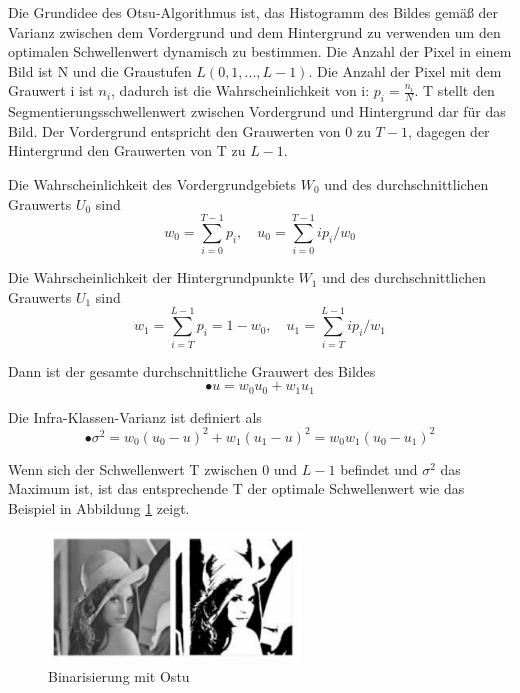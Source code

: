 Die Grundidee des Otsu-Algorithmus ist, das Histogramm des Bildes gemäß der Varianz zwischen dem Vordergrund und dem Hintergrund zu verwenden um den optimalen Schwellenwert dynamisch zu bestimmen. Die Anzahl der Pixel in einem Bild ist N und die Graustufen $ L(0,1,...,L-1) $. Die Anzahl der Pixel mit dem Grauwert i ist $ n_{i} $, dadurch ist die Wahrscheinlichkeit von i: $ p_{i} = \frac{n_{i}}{N} $. T stellt den Segmentierungsschwellenwert zwischen Vordergrund und Hintergrund dar für das Bild. Der Vordergrund entspricht den Grauwerten von 0 zu $ T-1 $, dagegen der Hintergrund den Grauwerten von T zu $ L -1 $.

Die Wahrscheinlichkeit des Vordergrundgebiets $ W_{0} $ und des durchschnittlichen Grauwerts $ U_{0} $ sind
\begin{equation}
  w_{0} = \sum_{i=0}^{T-1} p_{i},\quad u_{0} = \sum_{i=0}^{T-1} ip_{i}/w_{0}
\end{equation}

Die Wahrscheinlichkeit der Hintergrundpunkte $ W_{1} $ und des durchschnittlichen Grauwerts $ U_{1} $ sind
\begin{equation}
  w_{1} = \sum_{i=T}^{L-1} p_{i} = 1-w_{0},\quad u_{1} = \sum_{i=T}^{L-1} ip_{i}/w_{1}
\end{equation}

Dann ist der gesamte durchschnittliche Grauwert des Bildes
\begin{equation}
• u = w_{0}u_{0} + w_{1}u_{1}
\end{equation}

Die Infra-Klassen-Varianz ist definiert als
\begin{equation}
•\sigma^2 = w_{0}(u_{0} - u)^2 + w_{1}(u_{1} - u)^2 = w_{0}w_{1}(u_{0} - u_{1})^2
\end{equation}

Wenn sich der Schwellenwert T zwischen 0 und $ L-1 $ befindet und $ \sigma^2 $ das Maximum ist, ist das entsprechende T der optimale Schwellenwert wie das Beispiel in Abbildung \ref{fig:Binarisierung mit globalen Schwellenwertmethode} zeigt.

\begin{figure}[H]
 \centering 
  \includegraphics[keepaspectratio,width=0.6\textwidth]{images/4_ZweiteErfahrung/Binar/Ostu.pdf}
 \caption{Binarisierung mit Ostu}
 \label{fig:Binarisierung mit globalen Schwellenwertmethode}
\end{figure} 

